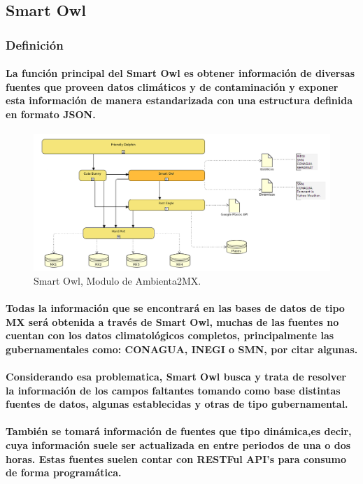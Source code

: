 \subsection{Smart Owl}
  \subsubsection{Definición}
  \paragraph{La función principal del Smart Owl es obtener información de diversas fuentes que proveen datos climáticos y de contaminación y exponer esta información de manera estandarizada con una estructura definida en formato JSON.}

  \begin{figure}[h!]
    \centering
      \includegraphics[width=\textwidth]{./images/DiagramaAmbienta2MX_SmartOwl.png}
    \caption{Smart Owl, Modulo de Ambienta2MX.} 
  \end{figure}

  \paragraph{Todas la información que se encontrará en las bases de datos de tipo MX será obtenida a través de Smart Owl, muchas de las fuentes no cuentan con los datos climatológicos completos, principalmente las gubernamentales como: CONAGUA, INEGI o SMN, por citar algunas.}
  \paragraph{Considerando esa problematica, Smart Owl busca y trata de resolver la información de los campos faltantes tomando como base distintas fuentes de datos, algunas establecidas y otras de tipo gubernamental.}
  \paragraph{También se tomará información de fuentes que tipo dinámica,es decir, cuya información suele ser actualizada en entre periodos de una o dos horas. Estas fuentes suelen contar con RESTFul API's para consumo de forma programática.}
